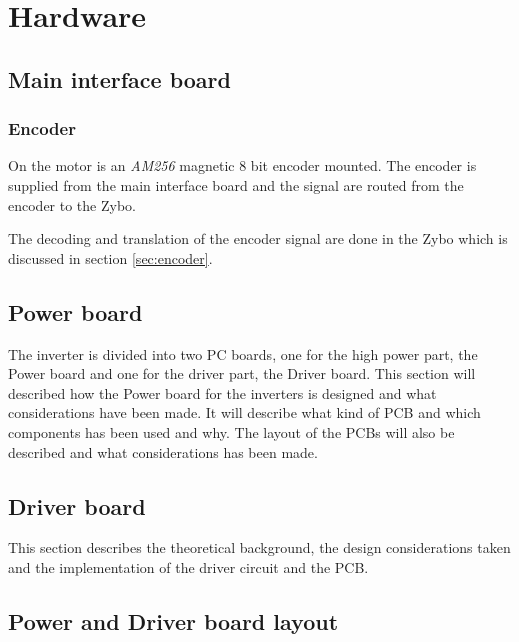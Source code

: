 \section{Hardware}
\label{sec:hardware}

\subsection{Main interface board}

\subsubsection{Encoder}

On the motor is an \textit{AM256} magnetic 8 bit encoder mounted. The encoder is supplied from the main interface board and the signal are routed from the encoder to the Zybo. 

The decoding and translation of the encoder signal are done in the Zybo which is discussed in section \ref{sec:encoder}.





\subsection{Power board}
The inverter is divided into two PC boards, one for the high power part, the Power board and one for the driver part, the Driver board. This section will described how the Power board for the inverters is designed and what considerations have been made. It will describe what kind of PCB and which components has been used and why. The layout of the PCBs will also be described and what considerations has been made. \\

% 
% 

\subsection{Driver board}
This section describes the theoretical background, the design considerations taken and the implementation of the driver circuit and the PCB.



\subsection{Power and Driver board layout}
